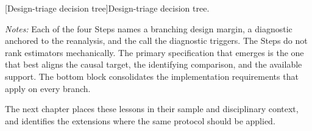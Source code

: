 \begin{landscape}
[Design-triage decision tree]{Design-triage decision tree.}
\label{fig:decision_tree}
{\footnotesize\textit{Notes:} Each of the four Steps names a branching design margin, a diagnostic anchored to the reanalysis, and the call the diagnostic triggers. The Steps do not rank estimators mechanically. The primary specification that emerges is the one that best aligns the causal target, the identifying comparison, and the available support. The bottom block consolidates the implementation requirements that apply on every branch.\par}
\end{landscape}
\clearpage

The next chapter places these lessons in their sample and disciplinary context, and identifies the extensions where the same protocol should be applied.
